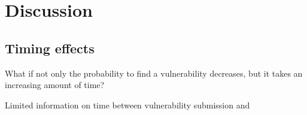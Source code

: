 \section{Discussion}
\label{sec:discussion}


\subsection{Timing effects}

What if not only the probability to find a vulnerability decreases, but it takes an increasing amount of time? 



Limited information on time between vulnerability submission and 



